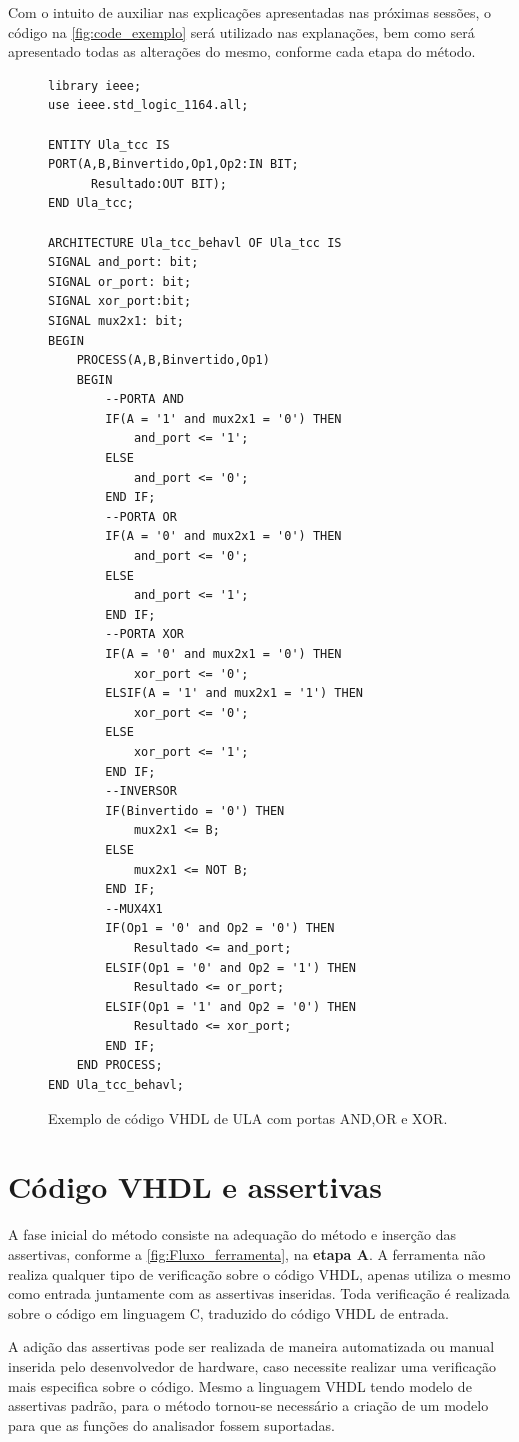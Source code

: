 Com o intuito de auxiliar nas explicações apresentadas nas próximas sessões, o código na \autoref{fig:code_exemplo} será utilizado nas explanações, bem como será apresentado todas as alterações do mesmo, conforme cada etapa do método.
\begin{figure}[H]
\caption{\label{fig:code_exemplo} Exemplo de código VHDL de ULA com portas AND,OR e XOR.}
	\begin{center}
    \begin{minipage}{0.6\textwidth}
    \begin{lstlisting}       
library ieee;
use ieee.std_logic_1164.all;

ENTITY Ula_tcc IS
PORT(A,B,Binvertido,Op1,Op2:IN BIT;
	  Resultado:OUT BIT);
END Ula_tcc;

ARCHITECTURE Ula_tcc_behavl OF Ula_tcc IS
SIGNAL and_port: bit;
SIGNAL or_port: bit;
SIGNAL xor_port:bit;
SIGNAL mux2x1: bit;
BEGIN
	PROCESS(A,B,Binvertido,Op1)
	BEGIN
		--PORTA AND
		IF(A = '1' and mux2x1 = '0') THEN
		    and_port <= '1';
		ELSE
		    and_port <= '0';
		END IF;
		--PORTA OR
		IF(A = '0' and mux2x1 = '0') THEN
		    and_port <= '0';
		ELSE
		    and_port <= '1';
		END IF;
		--PORTA XOR
		IF(A = '0' and mux2x1 = '0') THEN
		    xor_port <= '0';
		ELSIF(A = '1' and mux2x1 = '1') THEN
		    xor_port <= '0';
		ELSE
		    xor_port <= '1';
		END IF;
		--INVERSOR
		IF(Binvertido = '0') THEN
			mux2x1 <= B;
		ELSE
			mux2x1 <= NOT B;
		END IF;
		--MUX4X1
		IF(Op1 = '0' and Op2 = '0') THEN
			Resultado <= and_port;
		ELSIF(Op1 = '0' and Op2 = '1') THEN
			Resultado <= or_port;
		ELSIF(Op1 = '1' and Op2 = '0') THEN
			Resultado <= xor_port;
		END IF;
	END PROCESS;
END Ula_tcc_behavl;
    \end{lstlisting}
    \end{minipage}
	\end{center}
\end{figure}

\pagebreak
\section{\label{cap:vhdl_assertivas}Código VHDL e assertivas}

\par
A fase inicial do método consiste na adequação do método e inserção das assertivas, conforme a \autoref{fig:Fluxo_ferramenta}, na \textbf{etapa A}. A ferramenta não realiza qualquer tipo de verificação sobre o código VHDL, apenas utiliza o mesmo como entrada juntamente com as assertivas inseridas. Toda verificação é realizada sobre o código em linguagem C, traduzido do código VHDL de entrada.
\par
A adição das assertivas pode ser realizada de maneira automatizada ou manual inserida pelo desenvolvedor de hardware, caso necessite realizar uma verificação mais especifica sobre o código. Mesmo a linguagem VHDL tendo modelo de assertivas padrão, para o método tornou-se necessário a criação de um modelo para que as funções do analisador fossem suportadas.

